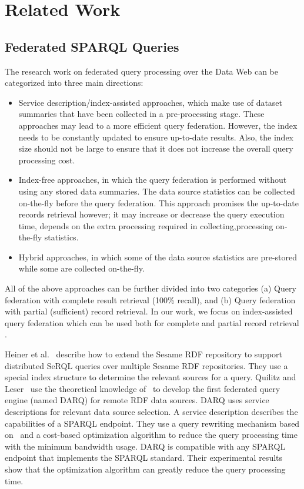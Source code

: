 \documentclass{sig-alternate}  %
\begin{document}
\section{Related Work}
\subsection{Federated SPARQL Queries}
The research work on federated query processing over the Data Web
can be categorized into three main directions: 
\begin{itemize}
\item Service description/index-assisted approaches, which make use of dataset summaries that have been collected in a pre-processing stage.
These approaches may lead to a more efficient query federation. However,
the index needs to be constantly updated to ensure up-to-date results.
Also, the index size should not be large to ensure that it does not
increase the overall query processing cost. 
\item Index-free approaches, in which the query federation is performed
without using any stored data summaries. The data source statistics can be collected on-the-fly before the query federation. This approach promises the up-to-date records retrieval however; it may increase or decrease the query execution time, depends on the extra processing required in collecting,processing on-the-fly statistics.
\item Hybrid approaches, in which some of the data source statistics are pre-stored while some are collected on-the-fly. 
\end{itemize}
All of the above approaches can be further divided into two categories
(a) Query federation with complete result retrieval (100\% recall), and (b) Query federation
with partial (sufficient) record retrieval. In our work, we focus
on index-assisted query federation which can be used both for complete and partial record retrieval .

Heiner et al.~\cite{key-1} describe how to extend the Sesame RDF
repository to support distributed SeRQL queries over multiple Sesame
RDF repositories. They use a special index structure to determine
the relevant sources for a query. Quilitz and Leser~\cite{key-2}
use the theoretical knowledge of~\cite{key-1} to develop the first federated
query engine (named DARQ) for remote RDF data sources. DARQ uses service
descriptions for relevant data source selection. A service description
describes the capabilities of a SPARQL endpoint. They use a query rewriting
mechanism based on~\cite{key-8} and a cost-based optimization algorithm
to reduce the query processing time with the minimum bandwidth usage.
DARQ is compatible with any SPARQL endpoint that implements the SPARQL
standard. Their experimental results show that the optimization algorithm
can greatly reduce the query processing time.
\end{document}
